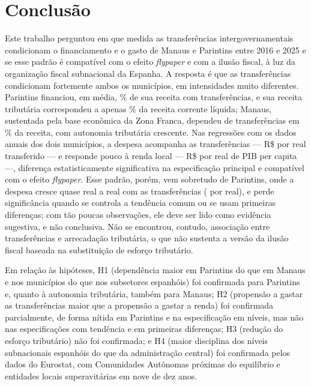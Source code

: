\section{Conclusão}\label{sec:conclusao}

Este trabalho perguntou em que medida as transferências intergovernamentais condicionam o financiamento e o gasto de Manaus e Parintins entre 2016 e 2025 e se esse padrão é compatível com o efeito \textit{flypaper} e com a ilusão fiscal, à luz da organização fiscal subnacional da Espanha. A resposta é que as transferências condicionam fortemente ambos os municípios, em intensidades muito diferentes. Parintins financiou, em média, \depParMedia\% de sua receita com transferências, e sua receita tributária correspondeu a apenas \autParMedia\% da receita corrente líquida; Manaus, sustentada pela base econômica da Zona Franca, dependeu de transferências em \depManMedia\% da receita, com autonomia tributária crescente. Nas regressões com os dados anuais dos dois municípios, a despesa acompanha as transferências --- R\$ \bTrUm{} por real transferido --- e responde pouco à renda local --- R\$ \bPibUm{} por real de PIB per capita ---, diferença estatisticamente significativa na especificação principal e compatível com o efeito \textit{flypaper}. Esse padrão, porém, vem sobretudo de Parintins, onde a despesa cresce quase real a real com as transferências (\bTrDez{} por real), e perde significância quando se controla a tendência comum ou se usam primeiras diferenças; com tão poucas observações, ele deve ser lido como evidência sugestiva, e não conclusiva. Não se encontrou, contudo, associação entre transferências e arrecadação tributária, o que não sustenta a versão da ilusão fiscal baseada na substituição de esforço tributário.

Em relação às hipóteses, H1 (dependência maior em Parintins do que em Manaus e nos municípios do que nos subsetores espanhóis) foi confirmada para Parintins e, quanto à autonomia tributária, também para Manaus; H2 (propensão a gastar as transferências maior que a propensão a gastar a renda) foi confirmada parcialmente, de forma nítida em Parintins e na especificação em níveis, mas não nas especificações com tendência e em primeiras diferenças; H3 (redução do esforço tributário) não foi confirmada; e H4 (maior disciplina dos níveis subnacionais espanhóis do que da administração central) foi confirmada pelos dados do Eurostat, com Comunidades Autônomas próximas do equilíbrio e entidades locais superavitárias em nove de dez anos.

